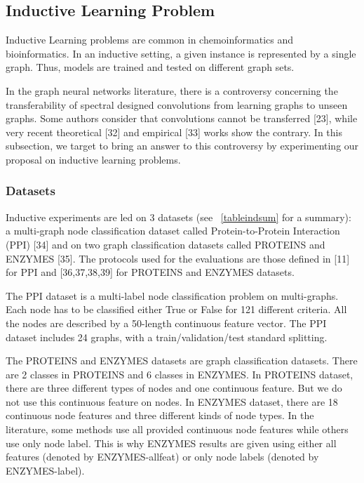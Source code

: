 \documentclass{article}
\begin{document}
\subsection{Inductive Learning Problem}
Inductive Learning problems are common in chemoinformatics and bioinformatics. In an inductive setting, a given instance is represented by a single graph. Thus, models are trained and tested on different graph sets.

In the graph neural networks literature, there is a controversy concerning the transferability of spectral designed convolutions from learning graphs to unseen graphs. Some authors consider that convolutions cannot be transferred [23], while very recent theoretical  [32] and empirical [33] works show the contrary. 
In this subsection, we target to bring an answer to this controversy by experimenting our proposal on inductive learning problems. 

\subsubsection{Datasets} 

Inductive experiments are led on 3 datasets (see \tablename~\ref{tableindsum} for a summary): a multi-graph node classification dataset called Protein-to-Protein Interaction (PPI) [34] and on two graph classification datasets called PROTEINS and ENZYMES [35]. The protocols used for the evaluations are those defined in [11] for PPI and  [36,37,38,39] for PROTEINS and ENZYMES datasets.

The PPI dataset is a multi-label node classification problem on multi-graphs. Each node has to be classified either True or False for 121 different criteria. All the nodes are described by a 50-length continuous feature vector. The PPI dataset includes 24 graphs, with a train/validation/test standard splitting. 

The PROTEINS and ENZYMES datasets are graph classification datasets. There are 2 classes in PROTEINS and 6 classes in ENZYMES. In PROTEINS dataset, there are three different types of nodes and one continuous feature. But we do not use this continuous feature on nodes. In ENZYMES dataset, there are 18 continuous node features and three different kinds of node types. In the literature, some methods use all provided continuous node features while others use only node label. This is why ENZYMES results are given using either all features (denoted by ENZYMES-allfeat) or only node labels (denoted by ENZYMES-label). 
\end{document}
